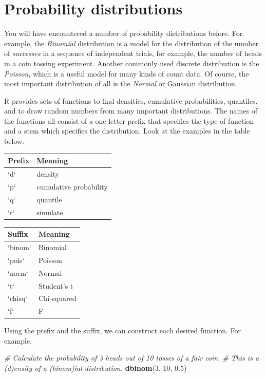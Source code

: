 \documentclass[]{book}
\newenvironment{Shaded}{\begin{snugshade}}{\end{snugshade}}
\newcommand{\CommentTok}[1]{\textcolor[rgb]{0.56,0.35,0.01}{\textit{#1}}}
\newcommand{\DecValTok}[1]{\textcolor[rgb]{0.00,0.00,0.81}{#1}}
\newcommand{\FloatTok}[1]{\textcolor[rgb]{0.00,0.00,0.81}{#1}}
\newcommand{\KeywordTok}[1]{\textcolor[rgb]{0.13,0.29,0.53}{\textbf{#1}}}
\newcommand{\NormalTok}[1]{#1}
\begin{document}
\hypertarget{distributions}{%
\section{Probability distributions}\label{distributions}}

You will have encountered a number of probability distributions before. For example, the \emph{Binomial} distribution is a model for the distribution of the number of \emph{successes} in a sequence of independent trials, for example, the number of heads in a coin tossing experiment. Another commonly used discrete distribution is the \emph{Poisson}, which is a useful model for many kinds of count data. Of course, the most important distribution of all is the \emph{Normal} or Gaussian distribution.

R provides sets of functions to find densities, cumulative probabilities, quantiles, and to draw random numbers from many important distributions. The names of the functions all consist of a one letter prefix that specifies the type of function and a stem which specifies the distribution. Look at the examples in the table below.

\begin{tabular}{l|l}
\hline
Prefix & Meaning\\
\hline
`d` & density\\
\hline
`p` & cumulative probability\\
\hline
`q` & quantile\\
\hline
`r` & simulate\\
\hline
\end{tabular}

\begin{tabular}{l|l}
\hline
Suffix & Meaning\\
\hline
`binom` & Binomial\\
\hline
`pois` & Poisson\\
\hline
`norm` & Normal\\
\hline
`t` & Student's t\\
\hline
`chisq` & Chi-squared\\
\hline
`f` & F\\
\hline
\end{tabular}

Using the prefix and the suffix, we can construct each desired function. For example,

\begin{Shaded}
\begin{Highlighting}[]
\CommentTok{# Calculate the probability of 3 heads out of 10 tosses of a fair coin.}
\CommentTok{# This is a (d)ensity of a (binom)ial distribution.}
\KeywordTok{dbinom}\NormalTok{(}\DecValTok{3}\NormalTok{, }\DecValTok{10}\NormalTok{, }\FloatTok{0.5}\NormalTok{)}
\end{Highlighting}
\end{Shaded}
\end{document}
